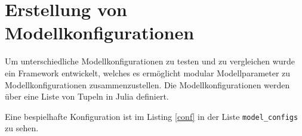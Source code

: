 



\cleardoublepage
\section{Erstellung von Modellkonfigurationen}

Um unterschiedliche Modellkonfigurationen zu testen und zu vergleichen wurde ein Framework entwickelt, welches es ermöglicht modular Modellparameter zu Modellkonfigurationen zusammenzustellen. Die Modellkonfigurationen werden über eine Liste von Tupeln in Julia definiert.

Eine bespielhafte Konfiguration ist im Listing \ref{conf} in der Liste \texttt{model\_configs} zu sehen.

\captionsetup[figure]{name=Listing}

